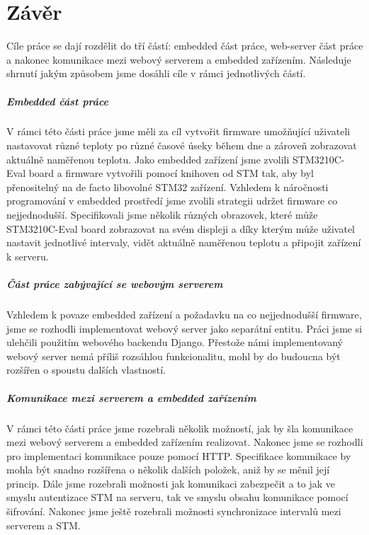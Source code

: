 \chapter*{Závěr}

Cíle práce se dají rozdělit do tří částí: embedded část práce, web-server část práce a nakonec
komunikace mezi webový serverem a embedded zařízením.
Následuje shrnutí jakým způsobem jsme dosáhli cíle v rámci jednotlivých částí.

\paragraph{Embedded část práce}
V rámci této části práce jsme měli za cíl vytvořit firmware umožňující uživateli nastavovat
různé teploty po různé časové úseky během dne a zároveň zobrazovat aktuálně naměřenou teplotu.
Jako embedded zařízení jsme zvolili STM3210C-Eval board a firmware vytvořili pomocí knihoven
od STM tak, aby byl přenositelný na de facto libovolné STM32 zařízení.
Vzhledem k náročnosti programování v embedded prostředí jsme zvolili strategii udržet firmware
co nejjednodušší.
Specifikovali jsme několik různých obrazovek, které může STM3210C-Eval board zobrazovat na svém
displeji a díky kterým může uživatel nastavit jednotlivé intervaly, vidět aktuálně naměřenou teplotu a
připojit zařízení k serveru.

\paragraph{Část práce zabývající se webovým serverem}
Vzhledem k povaze embedded zařízení a požadavku na co nejjednodušší firmware, jsme se rozhodli
implementovat webový server jako separátní entitu.
Práci jsme si ulehčili použitím webového backendu Django.
Přestože námi implementovaný webový server nemá příliš rozsáhlou funkcionalitu, mohl by do budoucna
být rozšířen o spoustu dalších vlastností.

\paragraph{Komunikace mezi serverem a embedded zařízením}
V rámci této části práce jsme rozebrali několik možností, jak by šla komunikace mezi webový serverem
a embedded zařízením realizovat.
Nakonec jsme se rozhodli pro implementaci komunikace pouze pomocí HTTP.
Specifikace komunikace by mohla být snadno rozšířena o několik dalších položek, aniž by se měnil její
princip.
Dále jsme rozebrali možnosti jak komunikaci zabezpečit a to jak ve smyslu autentizace STM na serveru,
tak ve smyslu  obsahu komunikace pomocí šifrování.
Nakonec jsme ještě rozebrali možnosti synchronizace intervalů mezi serverem a STM.


